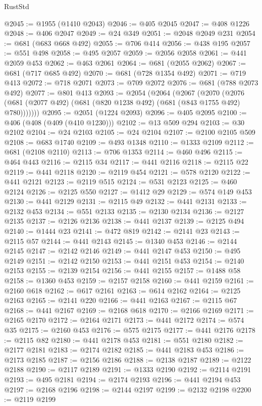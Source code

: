 \begin{lexlean}{RustStd}
\begin{coremodule}
{\begin{coremodule}
{{{{{{{{{{{{{{{{{{{{{{{{{@2045 := @1955 (@1410 @2043)
@2046 := @405 @2045
@2047 := @408 @1226
@2048 := @406 @2047
@2049 := @24 @349
@2051 := @2048 @2049 @231
@2054 := @681 (@683 @668 @492)
@2055 := @706 @414
@2056 := @438 @195
@2057 := @551 @498
@2058 := @495 @2057
@2059 := @2056 @2058
@2061 := @441 @2059 @453
@2062 := @463 @2061
@2064 := @681 (@2055 @2062)
@2067 := @681 (@717 @685 @492)
@2070 := @681 (@728 @1354 @492)
@2071 := @719 @413
@2072 := @718 @2071
@2073 := @709 @2072
@2076 := @681 (@788 @2073 @492)
@2077 := @801 @413
@2093 := @2054
    (@2064
      (@2067
        (@2070 (@2076 (@681 (@2077 @492) (@681 (@820 @1238 @492) (@681 (@843 @1755 @492) @780)))))))
@2095 := @2051 (@1224 @2093)
@2096 := @405 @2095
@2100 := @406 (@408 (@409 (@410 @1230)))
@2102 := @13 @509 @294
@2103 := @30 @2102
@2104 := @24 @2103
@2105 := @24 @2104
@2107 := @2100 @2105 @509
@2108 := @683 @1740
@2109 := @493 @1348
@2110 := @1333 @2109
@2112 := @681 (@2108 @2110)
@2113 := @706 @1353
@2114 := @460 @496
@2115 := @464 @443
@2116 := @2115 @34
@2117 := @441 @2116
@2118 := @2115 @22
@2119 := @441 @2118
@2120 := @2119 @454
@2121 := @578 @2120
@2122 := @441 @2121
@2123 := @2119 @515
@2124 := @531 @2123
@2125 := @460 @2124
@2126 := @2125 @550
@2127 := @1412 @29
@2129 := @574 @149 @453
@2130 := @441 @2129
@2131 := @2115 @49
@2132 := @441 @2131
@2133 := @2132 @453
@2134 := @551 @2133
@2135 := @2130 @2134
@2136 := @2127 @2135
@2137 := @2126 @2136
@2138 := @441 @2137
@2139 := @2125 @494
@2140 := @1444 @23
@2141 := @472 @819
@2142 := @2141 @23
@2143 := @2115 @57
@2144 := @441 @2143
@2145 := @1340 @453
@2146 := @2144 @2145
@2147 := @2142 @2146
@2149 := @441 @2147 @453
@2150 := @495 @2149
@2151 := @2142 @2150
@2153 := @441 @2151 @453
@2154 := @2140 @2153
@2155 := @2139 @2154
@2156 := @441 @2155
@2157 := @1488 @58
@2158 := @1360 @453
@2159 := @2157 @2158
@2160 := @441 @2159
@2161 := @2160 @618
@2162 := @617 @2161
@2163 := @614 @2162
@2164 := @2125 @2163
@2165 := @2141 @220
@2166 := @441 @2163
@2167 := @2115 @67
@2168 := @441 @2167
@2169 := @2168 @618
@2170 := @2166 @2169
@2171 := @2165 @2170
@2172 := @2164 @2171
@2173 := @441 @2172
@2174 := @574 @35
@2175 := @2160 @453
@2176 := @575 @2175
@2177 := @441 @2176
@2178 := @2115 @82
@2180 := @441 @2178 @453
@2181 := @551 @2180
@2182 := @2177 @2181
@2183 := @2174 @2182
@2185 := @441 @2183 @453
@2186 := @2173 @2185
@2187 := @2156 @2186
@2188 := @2138 @2187
@2189 := @2122 @2188
@2190 := @2117 @2189
@2191 := @1333 @2190
@2192 := @2114 @2191
@2193 := @495 @2181
@2194 := @2174 @2193
@2196 := @441 @2194 @453
@2197 := @2168 @2196
@2198 := @2144 @2197
@2199 := @2132 @2198
@2200 := @2119 @2199
}}}}}}}}}}}}}}}}}}}}}}}}}
\end{coremodule}}
\end{coremodule}
\end{lexlean}

